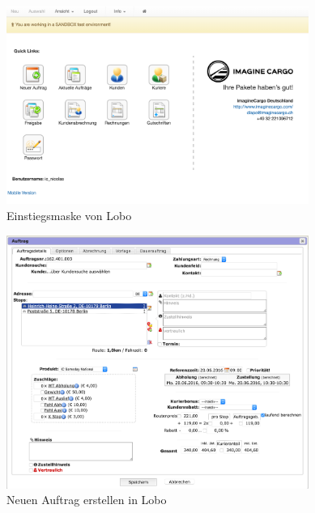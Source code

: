 \begin{figure}[ht]
	\centering
  \includegraphics[width=0.88\textwidth]{images/loboOverview.png}
	\caption{Einstiegsmaske von Lobo}
	\label{fig1:lobooverview}
\end{figure}

\begin{figure}[ht]
	\centering
  \includegraphics[width=0.88\textwidth]{images/loboNewtask.png}
	\caption{Neuen Auftrag erstellen in Lobo}
	\label{fig1:lobonewtask}
\end{figure}

